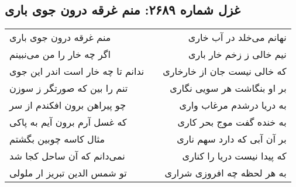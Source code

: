 \begin{center}
\section*{غزل شماره ۲۶۸۹: منم غرقه درون جوی باری}
\label{sec:2689}
\begin{longtable}{l p{0.5cm} r}
منم غرقه درون جوی باری
&&
نهانم می‌خلد در آب خاری
\\
اگر چه خار را من می‌نبینم
&&
نیم خالی ز زخم خار باری
\\
ندانم تا چه خار است اندر این جوی
&&
که خالی نیست جان از خارخاری
\\
تنم را بین که صورتگر ز سوزن
&&
بر او بنگاشت هر سویی نگاری
\\
چو پیراهن برون افکندم از سر
&&
به دریا درشدم مرغاب واری
\\
که غسل آرم برون آیم به پاکی
&&
به خنده گفت موج بحر کاری
\\
مثال کاسه چوبین بگشتم
&&
بر آن آبی که دارد سهم ناری
\\
نمی‌دانم که آن ساحل کجا شد
&&
که پیدا نیست دریا را کناری
\\
تو شمس الدین تبریز ار ملولی
&&
به هر لحظه چه افروزی شراری
\\
\end{longtable}
\end{center}
